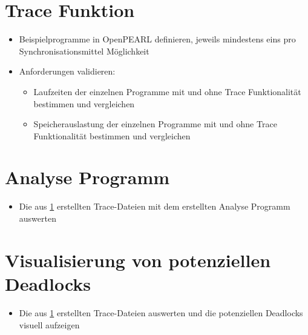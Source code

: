 \section{Trace Funktion}\label{Validierung:Trace Funktion}
\begin{itemize}
  \item Beispielprogramme in OpenPEARL definieren, jeweils mindestens eins pro
  Synchronisationsmittel Möglichkeit
  \item Anforderungen validieren:
  \begin{itemize}
    \item Laufzeiten der einzelnen Programme mit und ohne Trace Funktionalität
    bestimmen und vergleichen
    \item Speicherauslastung der einzelnen Programme mit und ohne Trace
    Funktionalität bestimmen und vergleichen
  \end{itemize}
\end{itemize}

\section{Analyse Programm}
\begin{itemize}
  \item Die aus \cref{Validierung:Trace Funktion} erstellten Trace-Dateien mit
  dem erstellten Analyse Programm auswerten
\end{itemize}

\section{Visualisierung von potenziellen Deadlocks}
\begin{itemize}
  \item Die aus \cref{Validierung:Trace Funktion} erstellten Trace-Dateien
  auswerten und die potenziellen Deadlocks visuell aufzeigen
\end{itemize}